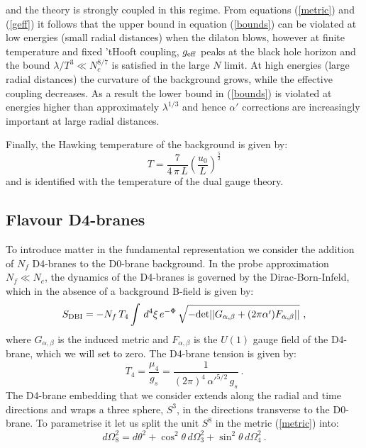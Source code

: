 \documentclass[a4paper]{jpconf}
\begin{document}
%
and the theory is strongly coupled in this regime. From equations (\ref{metric}) and (\ref{geff}) it follows that the upper bound in equation (\ref{bounds}) can be violated at low energies (small radial distances) when the dilaton blows, however at finite temperature and fixed 'tHooft coupling, $g_{\rm eff}$ peaks at the black hole horizon and the bound $\lambda/T^3 \ll N_c^{8/7}$ is satisfied in the large $N$ limit. At high energies (large radial distances) the curvature of the background grows, while the effective coupling decreases. As a result the lower bound in (\ref{bounds}) is violated at energies higher than approximately $\lambda^{1/3}$ and hence $\alpha'$ corrections are increasingly important at large radial distances.

Finally, the Hawking temperature of the background is given by:
%
\begin{equation}
T =\frac{7}{4\,\pi\,L}\left(\frac{u_0}{L}\right)^{\frac{5}{2}}
\end{equation}
%
and is identified with the temperature of the dual gauge theory.

\subsection{Flavour D4-branes}
\label{holo-condensate}
%
To introduce matter in the fundamental representation we consider the addition of $N_f$ D4-branes to the D0-brane background. In the probe approximation $N_f\ll N_c$, the dynamics of the D4-branes is governed by the Dirac-Born-Infeld, which in the absence of a background B-field is given by:
%
\begin{equation}\label{DBI}
S_{\rm DBI} = -N_f\,T_4\int\,d^4\xi\,e^{-\Phi}\,\sqrt{-{\rm det}||G_{\alpha,\beta}+(2\pi\alpha')F_{\alpha,\beta}||}\ ,
\end{equation}
%
where $G_{\alpha,\beta}$ is the induced metric and $F_{\alpha,\beta}$ is the $U(1)$ gauge field of the D4-brane, which we will set to zero. The D4-brane tension is given by:
%
\begin{equation}\label{tension}
T_4=\frac{\mu_4}{g_s}=\frac{1}{(2\pi)^4\,\alpha'^{5/2}\,g_s}\ .
\end{equation}
%
The D4-brane embedding that we consider extends along the radial and
time directions and wraps a three sphere, $S^3$, in the directions
transverse to the D0-brane. To parametrise it let us split the unit
$S^8$ in the metric (\ref{metric}) into:
%
\begin{equation}
d\Omega_8^2=d\theta^2+\cos^2\theta\,d\Omega_3^2+\sin^2\theta\,d\Omega_4^2\ .
\end{equation}
%
\end{document}
